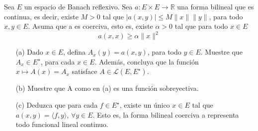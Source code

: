   Sea $E$ un espacio de Banach reflexivo. Sea  $a:E \times E \to \mathbb{R}$ una forma bilineal que es continua, es decir, existe $M>0$ tal que $|a(x, y)| \leq M\|x\|\|y\|$, para todo $x, y \in E$. Asuma que a es coerciva, esto es, existe $\alpha>0$ tal que para todo $x \in E$
$$
a(x, x) \geq \alpha\|x\|^2
$$
\begin{itemize}
    \item[(a)]Dado $x \in E$, defina $A_x(y)=a(x, y)$, para todo $y \in E$. Muestre que $A_x \in E^{\star}$, para cada $x \in E$. Además, concluya que la función $x \mapsto A(x)=A_x$ satisface $A \in \mathcal{L}\left(E, E^{\star}\right)$. 
    \item[(b)] Muestre que A como en (a) es una función sobreyectiva.
    \item[(c)] Deduzca que para cada $f \in E^{\star}$, existe un único $x \in E$ tal que $a(x, y)=\langle f, y\rangle$, $\forall y \in E$. Esto es, la forma bilineal coerciva a representa todo funcional lineal continuo.
\end{itemize}

